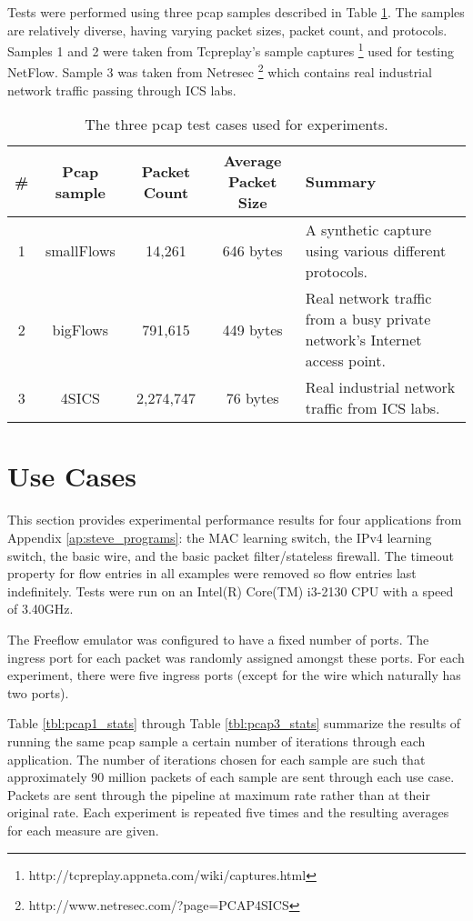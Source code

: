 Tests were performed using three pcap samples described in Table \ref{tbl:pcap}. 
The samples are relatively diverse, having varying packet sizes, packet count, and protocols. Samples 1 and 2 were taken from Tcpreplay's sample captures \footnote{http://tcpreplay.appneta.com/wiki/captures.html} used for testing NetFlow. Sample 3 was taken from Netresec \footnote{http://www.netresec.com/?page=PCAP4SICS} which contains real industrial network traffic passing through ICS labs.

\begin{table}[ht]
\caption{The three pcap test cases used for experiments.}
\begin{center}
\begin{tabularx}{\linewidth}{| c || c | c | c | X |}
\hline
\# & Pcap sample & Packet Count & Average Packet Size & Summary \\
\hline
1 & smallFlows & 14,261 & 646 bytes & A synthetic capture using various different protocols. \\
\hline
2 & bigFlows & 791,615 & 449 bytes & Real network traffic from a busy private network's Internet access point. \\
\hline
3 & 4SICS & 2,274,747 & 76 bytes & Real industrial network traffic from ICS labs. \\
\hline
\end{tabularx}
\end{center}
\label{tbl:pcap}
\end{table}


\section{Use Cases}

This section provides experimental performance results for four applications from Appendix \ref{ap:steve_programs}: the MAC learning switch, the IPv4 learning switch, the basic wire, and the basic packet filter/stateless firewall. The timeout property for flow entries in all examples were removed so flow entries last indefinitely. Tests were run on an Intel(R) Core(TM) i3-2130 CPU with a speed of 3.40GHz.

The Freeflow emulator was configured to have a fixed number of ports. The ingress port for each packet was randomly assigned amongst these ports. For each experiment, there were five ingress ports (except for the wire which naturally has two ports). 

Table \ref{tbl:pcap1_stats} through Table \ref{tbl:pcap3_stats} summarize the results of running the same pcap sample a certain number of iterations through each application. The number of iterations chosen for each sample are such that approximately 90 million packets of each sample are sent through each use case. Packets are sent through the pipeline at maximum rate rather than at their original rate. Each experiment is repeated five times and the resulting averages for each measure are given.

